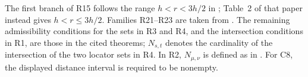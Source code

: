 \documentclass[preprint,12pt,a4paper]{elsarticle}
\begin{document}
{{\begin{minipage}[c][\textwidth][c]{0.98\textheight}
{\linespread{1}\fontsize{8.5}{10.1}\selectfont\raggedright The first branch of R15 follows the range $h<r<3h/2$ in \cite[Theorem~3(1)]{WanLianZhu2025}; Table~2 of that paper instead gives $h<r\le3h/2$. Families R21--R23 are taken from \cite[Corollary~4.9]{LiLiuJiang2026}. The remaining admissibility conditions for the sets in R3 and R4, and the intersection conditions in R1, are those in the cited theorems; $N_{s,t}$ denotes the cardinality of the intersection of the two locator sets in R4. In R2, $N_{\mu,\nu}$ is defined as in \cite[Section~3]{FangWenFu2024}. For C8, the displayed distance interval is required to be nonempty.\par}
\end{minipage}%
}}\par
\clearpage
\restoregeometry

\end{document}
